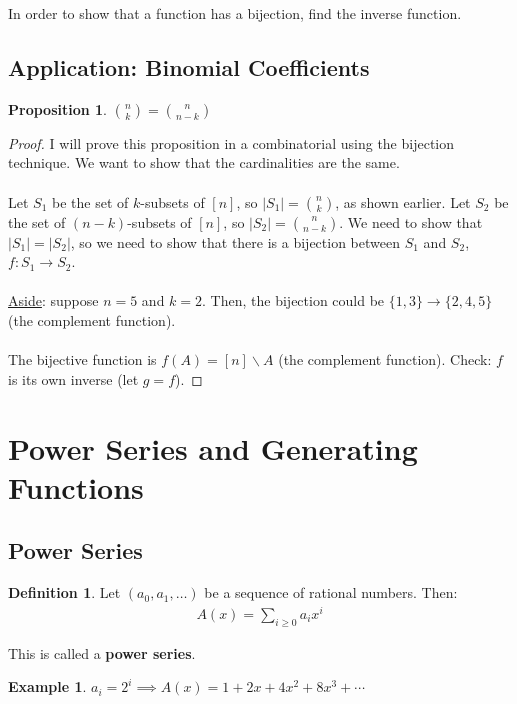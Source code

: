 \documentclass[]{article}
\newtheorem{proposition}{Proposition}[section]
\theoremstyle{definition}
\newtheorem{defn}{Definition}[section]
\newtheorem{ex}{Example}[section]
\begin{document}
			In order to show that a function has a bijection, find the inverse function.
			
			\subsection{Application: Binomial Coefficients}
				\begin{proposition}
					$\displaystyle {n \choose k} = {n \choose n - k}$
				\end{proposition}
				
				\begin{proof}
					I will prove this proposition in a combinatorial using the bijection technique. We want to show that the cardinalities are the same. 
					\\ \\
					Let $S_1$ be the set of $k$-subsets of $[n]$, so $|S_1| = {n \choose k}$, as shown earlier. Let $S_2$ be the set of $(n-k)$-subsets of $[n]$, so $|S_2| = {n \choose n - k}$. We need to show that $|S_1| = |S_2|$, so we need to show that there is a bijection between $S_1$ and $S_2$, $f: S_1 \to S_2$.
					\\ \\
					\underline{Aside}: suppose $n = 5$ and $k = 2$. Then, the bijection could be $\{1, 3\} \to \{2, 4, 5\}$ (the complement function).
					\\ \\
					The bijective function is $f(A) = [n]\backslash A$ (the complement function). Check: $f$ is its own inverse (let $g = f$).
				\end{proof}
				
	\section{Power Series and Generating Functions}
		\subsection{Power Series}
			\begin{defn}
					Let $(a_0, a_1, \ldots)$ be a sequence of rational numbers. Then:
					\begin{align*}
						A(x) = \sum_{i \ge 0} a_i x^i
					\end{align*}
					
					This is called a \textbf{power series}.
			\end{defn}
			
			\begin{ex}
				$a_i = 2^i \implies A(x) = 1 + 2x + 4x^2 + 8x^3 + \cdots$
			\end{ex}
\end{document}
